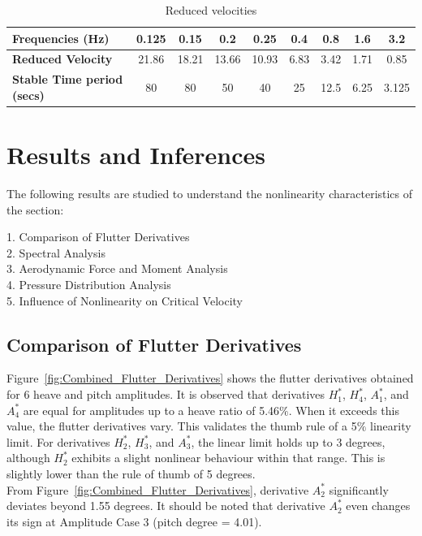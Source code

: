 \documentclass[a4paper, 12pt]{report}
\begin{document}
\begin{table}[htbp]
    \centering
    \caption{Reduced velocities}
    \label{tab:Reduced velocities}
    \begin{tabular}{|l|c|c|c|c|c|c|c|c|}
        \hline
        \textbf{Frequencies (Hz)} & 0.125 & 0.15 & 0.2 & 0.25 & 0.4 & 0.8 & 1.6 & 3.2 \\ \hline
        \textbf{Reduced Velocity} & 21.86 & 18.21 & 13.66 & 10.93 & 6.83 & 3.42 & 1.71 & 0.85 \\ \hline
        \textbf{Stable Time period (secs)} & 80 & 80 & 50 & 40 & 25 & 12.5 & 6.25 & 3.125 \\ \hline
    \end{tabular}
\end{table}

\section{Results and Inferences}

The following results are studied to understand the nonlinearity characteristics of the section:

\begin{flushleft}
\hspace{2cm}1. Comparison of Flutter Derivatives \\
\hspace{2cm}2. Spectral Analysis \\
\hspace{2cm}3. Aerodynamic Force and Moment Analysis \\
\hspace{2cm}4. Pressure Distribution Analysis \\
\hspace{2cm}5. Influence of Nonlinearity on Critical Velocity \\
\end{flushleft}

\subsection{Comparison of Flutter Derivatives}

Figure~\ref{fig:Combined_Flutter_Derivatives} shows the flutter derivatives obtained for 6 heave 
and pitch amplitudes. It is observed that derivatives $H_1^*$, $H_4^*$, $A_1^*$, and $A_4^*$ are equal for amplitudes up to a 
heave ratio of 5.46$\%$. When it exceeds this value, the flutter derivatives vary. This validates the thumb 
rule of a 5$\%$ linearity limit. For derivatives $H_2^*$, $H_3^*$, and $A_3^*$, the linear 
limit holds up to 3 degrees, although $H_2^*$ exhibits a slight nonlinear behaviour within that range. 
This is slightly lower than the rule of thumb of 5 degrees. \\ 
From Figure~\ref{fig:Combined_Flutter_Derivatives}, derivative $A_2^*$ significantly deviates beyond 1.55 degrees. 
It should be noted that derivative $A_2^*$ even changes its sign at Amplitude Case 3 (pitch degree = 4.01). 
\end{document}
